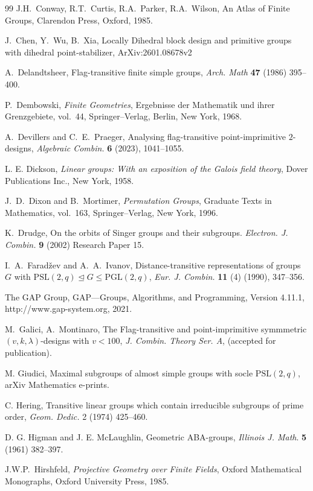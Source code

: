 \documentclass[a4paper,twopage,reqno,12pt]{amsart}
\theoremstyle{definition}
\numberwithin{equation}{section}
\newcommand{\PSL}{\mathrm{PSL}}
\newcommand{\PGL}{\mathrm{PGL}}
\renewcommand{\leq}{\leqslant}
\begin{document}
\begin{thebibliography}{99}
 J.H.~Conway, R.T.~Curtis, R.A.~Parker, R.A.~Wilson, An
Atlas of Finite Groups, Clarendon Press, Oxford, 1985.

 J.~Chen, Y.~Wu, B.~Xia, Locally Dihedral block design and primitive groups with dihedral point-stabilizer, ArXiv:2601.08678v2

 A.~Delandtsheer, 
Flag-transitive finite simple groups,
\emph{Arch. Math} \textbf{47} (1986) 395--400.

P.~Dembowski,
\emph{Finite Geometries},
Ergebnisse der Mathematik und ihrer Grenzgebiete, vol.~44,
Springer--Verlag, Berlin, New York, 1968.

A.~Devillers and C.~E.~Praeger,
Analysing flag-transitive point-imprimitive $2$-designs,
\emph{Algebraic Combin.} \textbf{6} (2023), 1041--1055.

 L. E. Dickson, \emph{Linear groups: With an exposition of the Galois field theory}, Dover Publications Inc., New York, 1958.

J.~D.~Dixon and B.~Mortimer,
\emph{Permutation Groups},
Graduate Texts in Mathematics, vol.~163,
Springer--Verlag, New York, 1996.

 K.~Drudge, On the orbits of Singer groups and their subgroups.
\emph{Electron. J. Combin.} \textbf{9} (2002) Research Paper 15.

I.~A.~Farad\v{z}ev and A.~A.~Ivanov,
Distance-transitive representations of groups $G$ with $\PSL(2,q)\unlhd G\leq \PGL(2,q)$,
\emph{Eur. J. Combin.} \textbf{11} (4) (1990), 347--356.

 The GAP Group, GAP---Groups, Algorithms, and Programming,
Version 4.11.1, http://www.gap-system.org, 2021.

 M.~Galici, A.~Montinaro, The Flag-transitive and point-imprimitive symmmetric $(v,k, \lambda)$-designs with $v<100$, \emph{J. Combin. Theory Ser. A}, (accepted for publication).

M. Giudici, 
Maximal subgroups of almost simple groups with socle $\PSL(2,q)$,
arXiv Mathematics e-prints.

 C. Hering, Transitive linear groups which contain irreducible subgroups of prime order, \emph{Geom. Dedic.} 2 (1974) 425–460.


 D. G. Higman and J. E. McLaughlin, Geometric ABA-groups,
\emph{Illinois J. Math}. \textbf{5} (1961) 382--397.

 J.W.P.~Hirshfeld, \emph{Projective Geometry over Finite Fields}, Oxford Mathematical Monographs, Oxford University Press, 1985.


\end{thebibliography}
\end{document}
